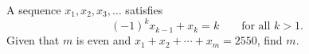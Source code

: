 A sequence $x_1,x_2,x_3,\dots$ satisfies
\[(-1)^kx_{k-1}+x_k=k\qquad\text{for all }k>1.\]
Given that $m$ is even and $x_1+x_2+\cdots+x_m=2550$, find $m$.
